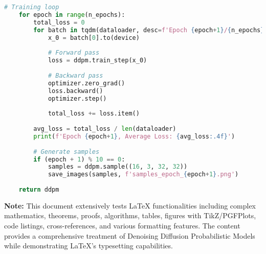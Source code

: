 \documentclass[11pt,a4paper]{article}
\theoremstyle{definition}
\begin{document}
\begin{lstlisting}[language=Python, caption=Complete DDPM Training Implementation]
    # Training loop
    for epoch in range(n_epochs):
        total_loss = 0
        for batch in tqdm(dataloader, desc=f'Epoch {epoch+1}/{n_epochs}'):
            x_0 = batch[0].to(device)
            
            # Forward pass
            loss = ddpm.train_step(x_0)
            
            # Backward pass
            optimizer.zero_grad()
            loss.backward()
            optimizer.step()
            
            total_loss += loss.item()
        
        avg_loss = total_loss / len(dataloader)
        print(f'Epoch {epoch+1}, Average Loss: {avg_loss:.4f}')
        
        # Generate samples
        if (epoch + 1) % 10 == 0:
            samples = ddpm.sample((16, 3, 32, 32))
            save_images(samples, f'samples_epoch_{epoch+1}.png')
    
    return ddpm
\end{lstlisting}

\vspace{1cm}

\noindent\textbf{Note:} This document extensively tests LaTeX functionalities including complex mathematics, theorems, proofs, algorithms, tables, figures with TikZ/PGFPlots, code listings, cross-references, and various formatting features. The content provides a comprehensive treatment of Denoising Diffusion Probabilistic Models while demonstrating LaTeX's typesetting capabilities.
\end{document}
